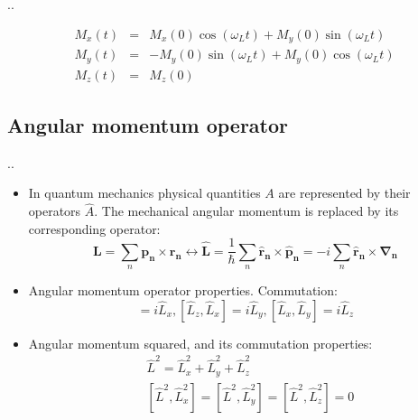 \documentclass{beamer}
\begin{document}
\begin{frame}{\thesection.\thesubsection. \insertsubsection}
\begin{itemize}[<+>]
			\begin{equation} 
			\begin{array}{lcl}
			M_x(t) &=& M_x(0) \cos(\omega_L t) + M_y(0) \sin (\omega_L t) \\
			M_y(t) &=& -M_y(0) \sin(\omega_L t) + M_y(0) \cos (\omega_L t) \\
			M_z(t) &=& M_z(0) 
			\end{array}
			\end{equation}
		
		
	\end{itemize}
		
\end{frame}

\subsection{Angular momentum operator}
\begin{frame}{\thesection.\thesubsection. \insertsubsection}
	
	\begin{itemize}[<+>]
		\item     In quantum mechanics physical quantities $A$ are represented by their operators $\hat{A}$. The mechanical angular momentum is replaced by its corresponding operator:
		\begin{equation}
		\bm{L} = \sum_{n} \bm{p_n} \times \bm{r_n}  \longleftrightarrow \bm{\hat{L}} = \dfrac{1}{\hbar} \sum_{n} \bm{\hat{r}_n} \times \bm{\hat{p}_n} =   -i \sum_{n} \bm{\hat{r}_n} \times \bm{\nabla_n}
		\end{equation}
		\item Angular momentum operator properties. Commutation:
		\begin{equation}
		  [\hat{L}_y,\hat{L}_z] = i\hat{L}_x, [\hat{L}_z,\hat{L}_x] = i\hat{L}_y, [\hat{L}_x,\hat{L}_y] = i\hat{L}_z
    	\end{equation}
		\item Angular momentum squared, and its commutation properties:
        \begin{align}
          &\hat{L}^2 = \hat{L}_x^2 + \hat{L}_y^2 + \hat{L}_z^2 \\
          &[\hat{L}^2, \hat{L}_x^2]=[\hat{L}^2, \hat{L}_y^2]=[\hat{L}^2, \hat{L}_z^2]= 0       
        \end{align}        
	\end{itemize}

\end{frame}
\end{document}
